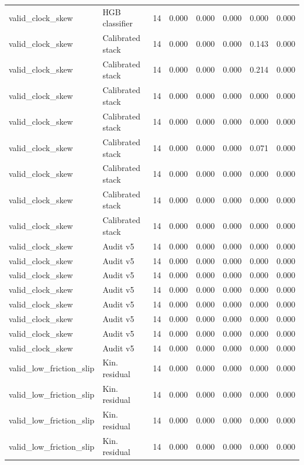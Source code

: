 {\begin{longtable}{llrrrrrr}
valid\_clock\_skew & HGB classifier & 14 & 0.000 & 0.000 & 0.000 & 0.000 & 0.000 \\
valid\_clock\_skew & Calibrated stack & 14 & 0.000 & 0.000 & 0.000 & 0.143 & 0.000 \\
valid\_clock\_skew & Calibrated stack & 14 & 0.000 & 0.000 & 0.000 & 0.214 & 0.000 \\
valid\_clock\_skew & Calibrated stack & 14 & 0.000 & 0.000 & 0.000 & 0.000 & 0.000 \\
valid\_clock\_skew & Calibrated stack & 14 & 0.000 & 0.000 & 0.000 & 0.000 & 0.000 \\
valid\_clock\_skew & Calibrated stack & 14 & 0.000 & 0.000 & 0.000 & 0.071 & 0.000 \\
valid\_clock\_skew & Calibrated stack & 14 & 0.000 & 0.000 & 0.000 & 0.000 & 0.000 \\
valid\_clock\_skew & Calibrated stack & 14 & 0.000 & 0.000 & 0.000 & 0.000 & 0.000 \\
valid\_clock\_skew & Calibrated stack & 14 & 0.000 & 0.000 & 0.000 & 0.000 & 0.000 \\
valid\_clock\_skew & Audit v5 & 14 & 0.000 & 0.000 & 0.000 & 0.000 & 0.000 \\
valid\_clock\_skew & Audit v5 & 14 & 0.000 & 0.000 & 0.000 & 0.000 & 0.000 \\
valid\_clock\_skew & Audit v5 & 14 & 0.000 & 0.000 & 0.000 & 0.000 & 0.000 \\
valid\_clock\_skew & Audit v5 & 14 & 0.000 & 0.000 & 0.000 & 0.000 & 0.000 \\
valid\_clock\_skew & Audit v5 & 14 & 0.000 & 0.000 & 0.000 & 0.000 & 0.000 \\
valid\_clock\_skew & Audit v5 & 14 & 0.000 & 0.000 & 0.000 & 0.000 & 0.000 \\
valid\_clock\_skew & Audit v5 & 14 & 0.000 & 0.000 & 0.000 & 0.000 & 0.000 \\
valid\_clock\_skew & Audit v5 & 14 & 0.000 & 0.000 & 0.000 & 0.000 & 0.000 \\
valid\_low\_friction\_slip & Kin. residual & 14 & 0.000 & 0.000 & 0.000 & 0.000 & 0.000 \\
valid\_low\_friction\_slip & Kin. residual & 14 & 0.000 & 0.000 & 0.000 & 0.000 & 0.000 \\
valid\_low\_friction\_slip & Kin. residual & 14 & 0.000 & 0.000 & 0.000 & 0.000 & 0.000 \\
valid\_low\_friction\_slip & Kin. residual & 14 & 0.000 & 0.000 & 0.000 & 0.000 & 0.000 \\

\end{longtable}}
